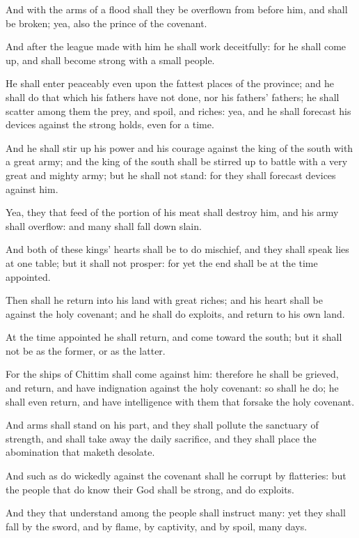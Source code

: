 \verse And with the arms of a flood shall they be overflown from before him, and shall be broken; yea, also the prince of the covenant.

\verse And after the league made with him he shall work deceitfully: for he shall come up, and shall become strong with a small people.

\verse He shall enter peaceably even upon the fattest places of the province; and he shall do that which his fathers have not done, nor his fathers' fathers; he shall scatter among them the prey, and spoil, and riches: yea, and he shall forecast his devices against the strong holds, even for a time.

\verse And he shall stir up his power and his courage against the king of the south with a great army; and the king of the south shall be stirred up to battle with a very great and mighty army; but he shall not stand: for they shall forecast devices against him.

\verse Yea, they that feed of the portion of his meat shall destroy him, and his army shall overflow: and many shall fall down slain.

\verse And both of these kings' hearts shall be to do mischief, and they shall speak lies at one table; but it shall not prosper: for yet the end shall be at the time appointed.

\verse Then shall he return into his land with great riches; and his heart shall be against the holy covenant; and he shall do exploits, and return to his own land.

\verse At the time appointed he shall return, and come toward the south; but it shall not be as the former, or as the latter.

\verse For the ships of Chittim shall come against him: therefore he shall be grieved, and return, and have indignation against the holy covenant: so shall he do; he shall even return, and have intelligence with them that forsake the holy covenant.

\verse And arms shall stand on his part, and they shall pollute the sanctuary of strength, and shall take away the daily sacrifice, and they shall place the abomination that maketh desolate.

\verse And such as do wickedly against the covenant shall he corrupt by flatteries: but the people that do know their God shall be strong, and do exploits.

\verse And they that understand among the people shall instruct many: yet they shall fall by the sword, and by flame, by captivity, and by spoil, many days.

